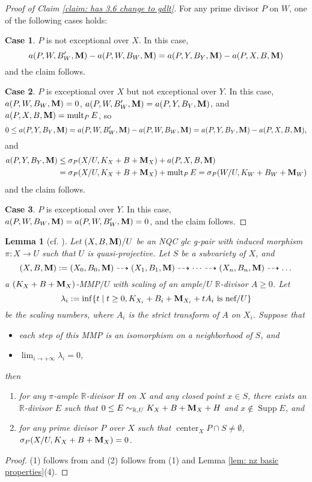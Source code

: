 \documentclass[11pt]{amsart}
\numberwithin{equation}{section}
\newcommand{\Mm}{{\bf{M}}}
\newcommand{\Rr}{\mathbb{R}}
\newcommand{\Center}{\operatorname{center}}
\newcommand{\Supp}{\operatorname{Supp}}
\newcommand{\mult}{\operatorname{mult}}
\newtheorem{lem}[thm]{Lemma}
\theoremstyle{definition}
\theoremstyle{definition}
\theoremstyle{definition}
\begin{document}
\begin{proof}[Proof of Claim \ref{claim: has 3.6 change to gdlt}]
For any prime divisor $P$ on $W$, one of the following cases holds:

\medskip

\noindent\textbf{Case 1}. $P$ is not exceptional over $X$. In this case, 
$$a(P,W,B_W',\Mm)-a(P,W,B_W,\Mm)=a(P,Y,B_Y,\Mm)-a(P,X,B,\Mm)$$
and the claim follows.

\medskip

\noindent\textbf{Case 2}. $P$ is exceptional over $X$ but not exceptional over $Y$. In this case, $a(P,W,B_W,\Mm)=0$, $a(P,W,B_W',\Mm)=a(P,Y,B_Y,\Mm)$, and $a(P,X,B,\Mm)=\mult_PE$, so
$$0\leq a(P,Y,B_Y,\Mm)=a(P,W,B_W',\Mm)-a(P,W,B_W,\Mm)=a(P,Y,B_Y,\Mm)-a(P,X,B,\Mm),$$
and
\begin{align*}
    a(P,Y,B_Y,\Mm)&\leq\sigma_P(X/U,K_X+B+\Mm_X)+a(P,X,B,\Mm)\\
    &=\sigma_P(X/U,K_X+B+\Mm_X)+\mult_PE=\sigma_P(W/U,K_W+B_W+\Mm_W)
\end{align*}
and the claim follows.

\medskip

\noindent\textbf{Case 3}. $P$ is exceptional over $Y$. In this case, $a(P,W,B_W,\Mm)=a(P,W,B'_W,\Mm)=0$, and the claim follows.
\end{proof}

\begin{lem}[{cf. \cite[Lemma 3.8]{Has22}}]\label{lem: has22 3.8 rel}
Let $(X,B,\Mm)/U$ be an NQC glc g-pair with induced morphism $\pi: X\rightarrow U$ such that $U$ is quasi-projective. Let $S$ be a subvariety of $X$, and
$$(X,B,\Mm):=(X_0,B_0,\Mm)\dashrightarrow (X_1,B_1,\Mm)\dashrightarrow\dots\dashrightarrow (X_n,B_n,\Mm)\dashrightarrow\dots$$
a $(K_X+B+\Mm_X)$-MMP$/U$ with scaling of an ample$/U$ $\Rr$-divisor $A\geq 0$. Let
$$\lambda_i:=\inf\{t\mid t\geq 0, K_{X_i}+B_i+\Mm_{X_i}+tA_i\text{ is nef}/U\}$$
be the scaling numbers, where $A_i$ is the strict transform of $A$ on $X_i$. Suppose that
\begin{itemize}
    \item each step of this MMP is an isomorphism on a neighborhood of $S$, and
    \item $\lim_{i\rightarrow+\infty}\lambda_i=0$,
\end{itemize}
then 
\begin{enumerate}
    \item for any $\pi$-ample $\Rr$-divisor $H$ on $X$ and any closed point $x\in S$, there exists an $\Rr$-divisor $E$ such that $0\leq E\sim_{\mathbb{R},U}K_X+B+\Mm_X+H$ and $x\not\in\Supp E$, and
    \item  for any prime divisor $P$ over $X$ such that $\Center_XP\cap S\not=\emptyset$, $\sigma_P(X/U,K_X+B+\Mm_X)=0$.
\end{enumerate} 
\end{lem}
\begin{proof}
(1) follows from \cite[Lemma 3.8]{Has22} and (2) follows from (1) and Lemma \ref{lem: nz basic properties}(4).
\end{proof}
\end{document}

